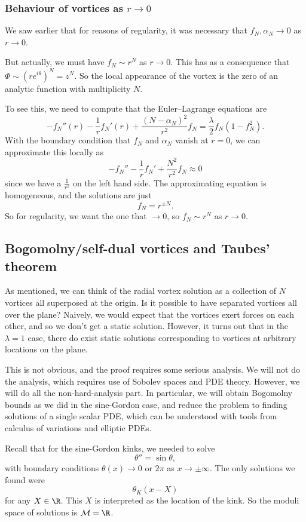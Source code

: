 \documentclass[a4paper]{article}
\begin{document}
\subsubsection*{Behaviour of vortices as $r \to 0$}
We saw earlier that for reasons of regularity, it was necessary that $f_N, \alpha_N \to 0$ as $r \to 0$.

But actually, we must have $f_N \sim r^N$ as $r \to 0$. This has as a consequence that $\Phi \sim (r e^{i\theta})^N = z^N$. So the local appearance of the vortex is the zero of an analytic function with multiplicity $N$.

To see this, we need to compute that the Euler--Lagrange equations are
\[
  -f_N''(r) - \frac{1}{r} f_N'(r) + \frac{(N - \alpha_N)^2}{r^2} f_N = \frac{\lambda}{2} f_N(1 - f_N^2).
\]
With the boundary condition that $f_N$ and $\alpha_N$ vanish at $r = 0$, we can approximate this locally as
\[
  - f_N'' - \frac{1}{r} f_N' + \frac{N^2}{r^2} f_N \approx 0
\]
since we have a $\frac{1}{r^2}$ on the left hand side. The approximating equation is homogeneous, and the solutions are just
\[
  f_N = r^{\pm N}.
\]
So for regularity, we want the one that $\to 0$, so $f_N \sim r^N$ as $r \to 0$.

\subsection{Bogomolny/self-dual vortices and Taubes' theorem}
As mentioned, we can think of the radial vortex solution as a collection of $N$ vortices all superposed at the origin. Is it possible to have separated vortices all over the plane? Naively, we would expect that the vortices exert forces on each other, and so we don't get a static solution. However, it turns out that in the $\lambda = 1$ case, there do exist static solutions corresponding to vortices at arbitrary locations on the plane.

This is not obvious, and the proof requires some serious analysis. We will not do the analysis, which requires use of Sobolev spaces and PDE theory. However, we will do all the non-hard-analysis part. In particular, we will obtain Bogomolny bounds as we did in the sine-Gordon case, and reduce the problem to finding solutions of a single scalar PDE, which can be understood with tools from calculus of variations and elliptic PDEs.

Recall that for the sine-Gordon kinks, we needed to solve
\[
  \theta'' = \sin \theta,
\]
with boundary conditions $\theta(x) \to 0$ or $2\pi$ as $x \to \pm \infty$. The only solutions we found were
\[
  \theta_K (x - X)
\]
for any $X \in \R$. This $X$ is interpreted as the location of the kink. So the moduli space of solutions is $\mathcal{M} = \R$.
\end{document}
